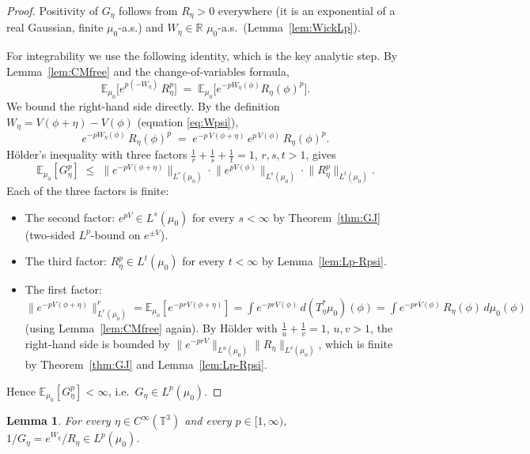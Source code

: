 \documentclass[12pt]{article}
\newtheorem{lemma}[theorem]{Lemma}
\theoremstyle{definition}
\begin{document}
\begin{proof}
Positivity of $G_\eta$ follows from $R_\eta>0$ everywhere (it is an exponential of a real
Gaussian, finite $\mu_0$-a.s.) and $W_\eta\in\mathbb{R}$ $\mu_0$-a.s.\ (Lemma~\ref{lem:WickLp}).

For integrability we use the following identity, which is the key analytic step. By
Lemma~\ref{lem:CMfree} and the change-of-variables formula,
\begin{equation}\label{eq:key-identity}
\mathbb{E}_{\mu_0}\!\bigl[e^{p(-W_\eta)}\,R_\eta^p\bigr]
\;=\; \mathbb{E}_{\mu_0}\!\bigl[e^{-pW_\eta(\phi)}R_\eta(\phi)^{p}\bigr].
\end{equation}
We bound the right-hand side directly. By the definition $W_\eta=V(\phi+\eta)-V(\phi)$
(equation \eqref{eq:Wpsi}),
\[
e^{-pW_\eta(\phi)}\,R_\eta(\phi)^{p}
\;=\; e^{-p\,V(\phi+\eta)}\,e^{p\,V(\phi)}\,R_\eta(\phi)^{p}.
\]
H\"older's inequality with three factors $\frac{1}{r}+\frac{1}{s}+\frac{1}{t}=1$,
$r,s,t>1$, gives
\begin{equation}\label{eq:holder}
\mathbb{E}_{\mu_0}[G_\eta^p]
\;\le\; \bigl\|e^{-pV(\phi+\eta)}\bigr\|_{L^r(\mu_0)}\cdot
\bigl\|e^{pV(\phi)}\bigr\|_{L^s(\mu_0)}\cdot
\bigl\|R_\eta^p\bigr\|_{L^t(\mu_0)}.
\end{equation}
Each of the three factors is finite:
\begin{itemize}
\item[(i)] The second factor: $e^{pV}\in L^s(\mu_0)$ for every $s<\infty$ by
Theorem~\ref{thm:GJ} (two-sided $L^p$-bound on $e^{\pm V}$).
\item[(ii)] The third factor: $R_\eta^p\in L^t(\mu_0)$ for every $t<\infty$ by
Lemma~\ref{lem:Lp-Rpsi}.
\item[(iii)] The first factor: $\bigl\|e^{-pV(\phi+\eta)}\bigr\|_{L^r(\mu_0)}^r
=\mathbb{E}_{\mu_0}[e^{-prV(\phi+\eta)}]
=\int e^{-prV(\phi)}\,d(T_\eta^*\mu_0)(\phi)
=\int e^{-prV(\phi)}\,R_\eta(\phi)\,d\mu_0(\phi)$
(using Lemma~\ref{lem:CMfree} again). By H\"older with $\frac{1}{u}+\frac{1}{v}=1$,
$u,v>1$, the right-hand side is bounded by
$\|e^{-prV}\|_{L^u(\mu_0)}\|R_\eta\|_{L^v(\mu_0)}$, which is finite by
Theorem~\ref{thm:GJ} and Lemma~\ref{lem:Lp-Rpsi}.
\end{itemize}
Hence $\mathbb{E}_{\mu_0}[G_\eta^p]<\infty$, i.e.\ $G_\eta\in L^p(\mu_0)$.
\end{proof}

\begin{lemma}\label{lem:Ginv-Lp}
For every $\eta\in C^\infty(\mathbb{T}^3)$ and every $p\in[1,\infty)$,
$1/G_\eta=e^{W_\eta}/R_\eta\in L^p(\mu_0)$.
\end{lemma}
\end{document}
